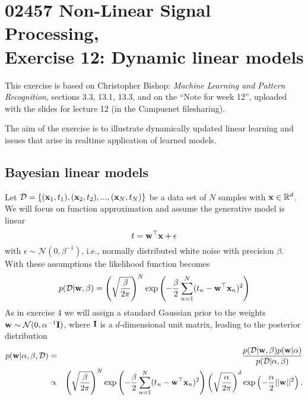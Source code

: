 \documentclass[A4,12pt]{article}    %
\def\xb{{\bf x}}
\def\wb{{\bf w}}
\def\xb{{\bf x}}
\def\Ib{{\bf I}}
\begin{document}
\section*{02457 Non-Linear Signal Processing,\\
 Exercise 12: Dynamic linear models}

This exercise is based on Christopher Bishop: {\it Machine
Learning and Pattern Recognition}, sections 3.3, 13.1, 13.3, and on the ``Note for week 12'', uploaded with the slides for lecture 12 (in the Campusnet filesharing).

The aim of the exercise is to illustrate dynamically updated linear learning and issues that arise in realtime application of learned models.


\subsection*{Bayesian linear models}
Let $\mathcal{D} = \{(\xb_1,t_1),(\xb_2,t_2),...,(\xb_N,t_N)\}$ be a data set of $N$ samples with $\xb \in \mathbb{R}^d$. We will focus on function approximation and assume the generative model is linear
\begin{equation}
 t   = \wb^{\top}\xb + \epsilon
\end{equation}
with $\epsilon \sim \mathcal{N}(0,\beta^{-1})$, i.e., normally distributed white noise with precision $\beta$. With these assumptions the likelihood function becomes
\begin{equation}
 p(\mathcal{D}|\wb,\beta)   =  \left(\sqrt{\frac{\beta}{2\pi}}\right)^{N} \exp\left(-\frac{\beta}{2}\sum_{n=1}^{N}(t_n-\wb^{\top}\xb_n )^2 \right)
\end{equation}
As in exercise 4 we will assign a standard Gaussian prior to the weights $\wb \sim \mathcal{N}(0,\alpha^{-1}\Ib) $, where $\Ib$ is a $d$-dimensional unit matrix, leading
to the posterior distribution
\begin{eqnarray}
 p(\wb|\alpha,\beta,\mathcal{D}) &=& \frac{p(\mathcal{D}|\wb,\beta)p(\wb|\alpha)}{p(\mathcal{D}|\alpha,\beta)} \nonumber \\
&\propto&\left(\sqrt{\frac{\beta}{2\pi}}\right)^{N} \exp\left(-\frac{\beta}{2}\sum_{n=1}^{N}(t_n-\wb^{\top}\xb_n)^2\right) \left(\sqrt{\frac{\alpha}{2\pi}}\right)^{d} \exp\left(-\frac{\alpha}{2}||\wb||^2\right). \nonumber
\end{eqnarray}
\end{document}
